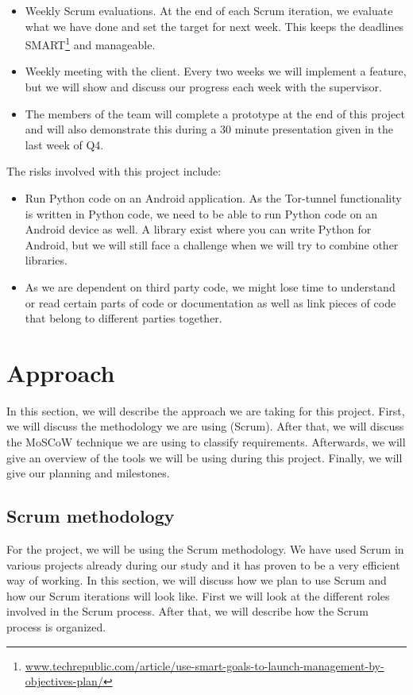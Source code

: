 \begin{itemize}
\item Weekly Scrum evaluations. At the end of each Scrum iteration, we evaluate what we have done and set the target for next week. This keeps the deadlines SMART\footnote{\href{http://www.techrepublic.com/article/use-smart-goals-to-launch-management-by-objectives-plan/}{www.techrepublic.com/article/use-smart-goals-to-launch-management-by-objectives-plan/}} and manageable.
\item Weekly meeting with the client. Every two weeks we will implement a feature, but we will show and discuss our progress each week with the supervisor.
\item The members of the team will complete a prototype at the end of this project and will also demonstrate this during a 30 minute presentation given in the last week of Q4.
\end{itemize}

The risks involved with this project include:
\begin{itemize}
\item Run Python code on an Android application. As the Tor-tunnel functionality is written in Python code, we need to be able to run Python code on an Android device as well. A library exist where you can write Python for Android, but we will still face a challenge when we will try to combine other libraries.
\item As we are dependent on third party code, we might lose time to understand or read certain parts of code or documentation as well as link pieces of code that belong to different parties together.
\end{itemize}



\section{Approach}
In this section, we will describe the approach we are taking for this project. First, we will discuss the methodology we are using (Scrum). After that, we will discuss the MoSCoW technique we are using to classify requirements. Afterwards, we will give an overview of the tools we will be using during this project. Finally, we will give our planning and milestones.

\subsection{Scrum methodology}
For the project, we will be using the Scrum methodology. We have used Scrum in various projects already during our study and it has proven to be a very efficient way of working. In this section, we will discuss how we plan to use Scrum and how our Scrum iterations will look like. First we will look at the different roles involved in the Scrum process. After that, we will describe how the Scrum process is organized.

